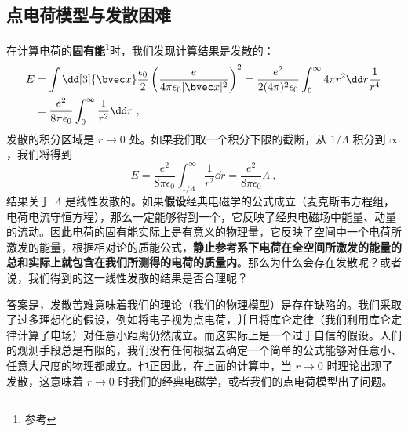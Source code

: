 
\subsection{点电荷模型与发散困难}
在计算电荷的\textbf{固有能}\footnote{参考}时，我们发现计算结果是发散的：
\begin{equation}\label{eq_elecdb_1}
\begin{aligned}
E&=\int \dd[3]{\bvec x}\frac{\epsilon_0}{2} \left(\frac{e}{4\pi\epsilon_0 |\bvec x|^2}\right)^2=\frac{e^2}{2(4\pi)^2\epsilon_0}\int_0^\infty 4\pi r^2\dd r \frac{1}{r^4}\\
&=\frac{e^2}{8\pi\epsilon_0} \int_0^\infty \frac{1}{r^2}\dd r~,
\end{aligned}
\end{equation}
发散的积分区域是 $r\rightarrow 0$ 处。如果我们取一个积分下限的截断，从 $1/\Lambda$ 积分到 $\infty$，我们将得到
\begin{equation}
E=\frac{e^2}{8\pi\epsilon_0}\int_{1/\Lambda}^{\infty} \frac{1}{r^2}\dd r=\frac{e^2}{8\pi\epsilon_0}\Lambda~,
\end{equation}
结果关于 $\Lambda$ 是线性发散的。如果\textbf{假设}经典电磁学的公式成立（麦克斯韦方程组，电荷电流守恒方程），那么一定能够得到一个，它反映了经典电磁场中能量、动量的流动。因此电荷的固有能实际上是有意义的物理量，它反映了空间中一个电荷所激发的能量，根据相对论的质能公式，\textbf{静止参考系下电荷在全空间所激发的能量的总和实际上就包含在我们所测得的电荷的质量内}。那么为什么会存在发散呢？或者说，我们得到的这一线性发散的结果是否合理呢？

答案是，发散苦难意味着我们的理论（我们的物理模型）是存在缺陷的。我们采取了过多理想化的假设，例如将电子视为点电荷，并且将库仑定律（我们利用库仑定律计算了电场）对任意小距离仍然成立。而这实际上是一个过于自信的假设。人们的观测手段总是有限的，我们没有任何根据去确定一个简单的公式能够对任意小、任意大尺度的物理都成立。也正因此，在上面的计算中，当 $r\rightarrow 0$ 时理论出现了发散，这意味着 $r\rightarrow 0$ 时我们的经典电磁学，或者我们的点电荷模型出了问题。


